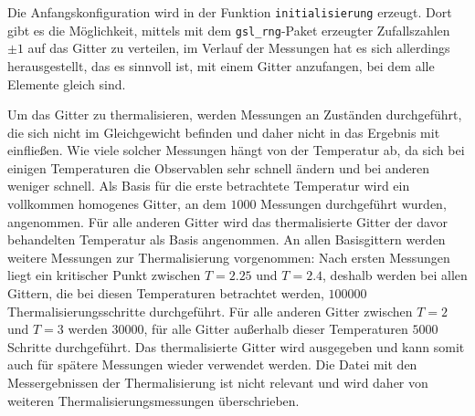 	
	Die Anfangskonfiguration wird in der Funktion \texttt{initialisierung} erzeugt. Dort gibt es die Möglichkeit, mittels mit dem \texttt{gsl\_rng}-Paket\cite{gsldoc} erzeugter Zufallszahlen $\pm 1$ auf das Gitter zu verteilen, im Verlauf der Messungen hat es sich allerdings herausgestellt, das es sinnvoll ist, mit einem Gitter anzufangen, bei dem alle Elemente gleich sind. 
	
	Um das Gitter zu thermalisieren, werden Messungen an Zuständen durchgeführt, die sich nicht im Gleichgewicht befinden und daher nicht in das Ergebnis mit einfließen. Wie viele solcher Messungen hängt von der Temperatur ab, da sich bei einigen Temperaturen die Observablen sehr schnell ändern und bei anderen weniger schnell. Als Basis für die erste betrachtete Temperatur wird ein vollkommen homogenes Gitter, an dem $\num{1000}$ Messungen durchgeführt wurden, angenommen. Für alle anderen Gitter wird das thermalisierte Gitter der davor behandelten Temperatur als Basis angenommen. An allen Basisgittern werden weitere Messungen zur Thermalisierung vorgenommen: Nach ersten Messungen liegt ein kritischer Punkt zwischen $T=\num{2,25}$ und $T=\num{2,4}$, deshalb werden bei allen Gittern, die bei diesen Temperaturen betrachtet werden, $\num{100000}$ Thermalisierungsschritte durchgeführt. Für alle anderen Gitter zwischen $T=\num{2}$ und $T=\num{3}$ werden $\num{30000}$, für alle Gitter außerhalb dieser Temperaturen $\num{5000}$ Schritte durchgeführt.
	Das thermalisierte Gitter wird ausgegeben und kann somit auch für spätere Messungen wieder verwendet werden. Die Datei mit den Messergebnissen der Thermalisierung ist nicht relevant und wird daher von weiteren Thermalisierungsmessungen überschrieben.
	
